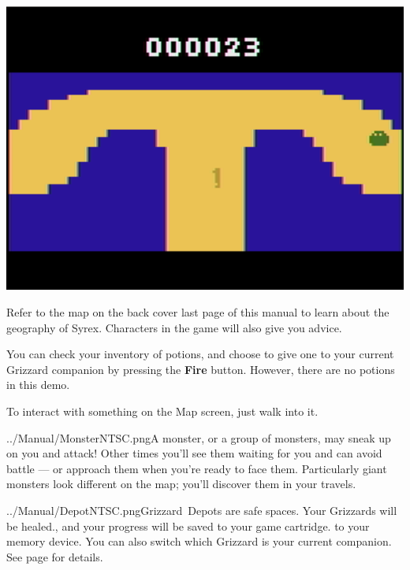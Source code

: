 \documentclass[9pt,twocolumn,openany,article]{memoir}
\newcommand\englishskip{\vspace{14pt}}
\begin{document}
\begin{center}
  \includegraphics[width=.75\columnwidth]{../Manual/MapNTSC.png}
\end{center}

Refer to  the map on  the \ifdefined\ATARIAGESAVE back cover  \else last
page  \fi of  this  manual  to learn  about  the  geography of  Syrex.
Characters in the game will also give you advice.

You can check your inventory of potions,  and choose to give one to your
current  Grizzard  companion  by   pressing  the  \textbf{Fire}  button.
\ifdefined\DEMO However, there are no potions in this demo. \fi

To interact with something on the Map screen, just walk into it.

\englishskip

\lettrine[image=true,                lines=3,               findent=3pt,
nindent=3pt]{../Manual/MonsterNTSC.png}{}\noindent{}A     monster,    or
a group of monsters, may sneak up  on you and attack! Other times you'll
see them waiting for you and can  avoid battle --- or approach them when
you're ready to face them. Particularly giant monsters look different on
the map; you'll discover them in your travels.

\englishskip

\lettrine[image=true,                lines=3,               findent=3pt,
nindent=3pt]{../Manual/DepotNTSC.png}{}\noindent{}Grizzard~Depots    are
safe spaces. Your Grizzards will be healed\ifdefined\NOSAVE{}.{}\else{},
and your  progress will  be saved  \ifdefined\ATARIAGESAVE to  your game
cartridge. \else  to your memory device.  \fi You can also  switch which
Grizzard    is     your    current     companion.    \fi     See    page
\pageref{sec:GrizzardDepot} for details.

\englishskip
\end{document}
